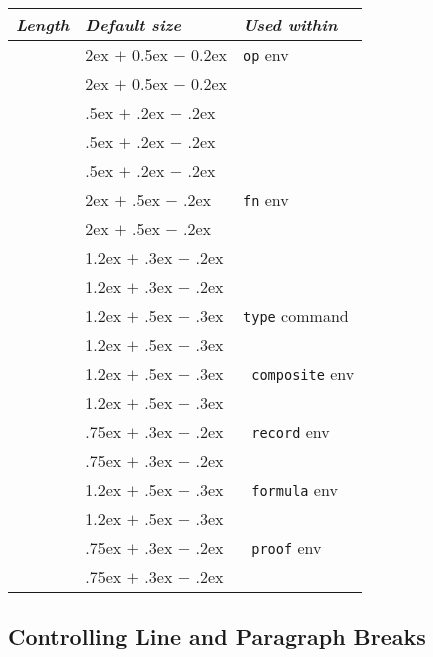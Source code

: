 \documentclass{article}
\renewcommand{\^}[1]{$\langle${\rm #1\/}$\rangle$}
\newcommand{\cs}[1]{\leavevmode\hbox{\tt \string#1}}
\begin{document}
\begin{center}
\begin{tabular}{|l|l|l|}
\hline
\em Length              &\em Default size &\em Used within      \\
\hline
\cs\preOperationSkip    &2ex $+$ 0.5ex $\minus$ 0.2ex & {\tt op} env    \\
\cs\postOperationSkip   &2ex $+$ 0.5ex $\minus$ 0.2ex   &\\
\cs\postHeaderSkip              &.5ex $+$ .2ex $\minus$ .2ex    &\\
\cs\postExternalsSkip   &.5ex $+$ .2ex $\minus$ .2ex    &\\
\cs\postPreConditionSkip        &.5ex $+$ .2ex $\minus$ .2ex    &\\
\hline
\cs\preFunctionSkip     &2ex $+$ .5ex $\minus$ .2ex & {\tt fn} env      \\
\cs\postFunctionSkip    &2ex $+$ .5ex $\minus$ .2ex     &\\
\cs\betweenSignatureAndBodySkip&1.2ex $+$ .3ex $\minus$ .2ex    &\\
\cs\betweenFunctionAndPreSkip&1.2ex $+$ .3ex $\minus$ .2ex      &\\
\hline
\cs\preTypeSkip &1.2ex $+$ .5ex $\minus$ .3ex & {\tt type} command      \\
\cs\postTypeSkip        &1.2ex $+$ .5ex $\minus$ .3ex   &\\
\hline
\cs\preCompositeSkip    &1.2ex $+$ .5ex $\minus$ .3ex & {\tt
composite} env  \\
\cs\postCompositeSkip   &1.2ex $+$ .5ex $\minus$ .3ex   &\\
\hline
\cs\preRecordSkip               &.75ex $+$ .3ex $\minus$ .2ex & {\tt
record} env     \\
\cs\postRecordSkip              &.75ex $+$ .3ex $\minus$ .2ex   &\\
\hline
\cs\preFormulaSkip              &1.2ex $+$ .5ex $\minus$ .3ex & {\tt
formula} env \\
\cs\postFormulaSkip             &1.2ex $+$ .5ex $\minus$ .3ex   &\\
\hline
\cs\preProofSkip                &.75ex $+$ .3ex $\minus$ .2ex & {\tt
proof} env      \\
\cs\postProofSkip               &.75ex $+$ .3ex $\minus$ .2ex   &\\
\hline
\end{tabular}
\end{center}

\subsection{Controlling Line and Paragraph Breaks}
\end{document}
